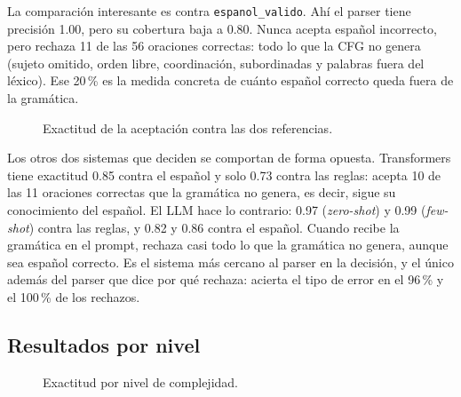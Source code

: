 La comparación interesante es contra \texttt{espanol\_valido}. Ahí el parser tiene precisión
1.00, pero su cobertura baja a 0.80. Nunca acepta español incorrecto, pero rechaza 11 de las 56
oraciones correctas: todo lo que la CFG no genera (sujeto omitido, orden libre, coordinación,
subordinadas y palabras fuera del léxico). Ese 20\,\% es la medida concreta de cuánto español
correcto queda fuera de la gramática.

\begin{figure}[h]
  \centering
  \caption{Exactitud de la aceptación contra las dos referencias.}
  \label{fig:reglas_vs_espanol}
\end{figure}

Los otros dos sistemas que deciden se comportan de forma opuesta. Transformers tiene
exactitud 0.85 contra el español y solo 0.73 contra las reglas: acepta 10 de las 11 oraciones
correctas que la gramática no genera, es decir, sigue su conocimiento del español. El LLM hace
lo contrario: 0.97 (\emph{zero-shot}) y 0.99 (\emph{few-shot}) contra las reglas, y 0.82 y 0.86
contra el español. Cuando recibe la gramática en el prompt, rechaza casi todo lo que la gramática
no genera, aunque sea español correcto. Es el sistema más cercano al parser en la decisión, y el
único además del parser que dice por qué rechaza: acierta el tipo de error en el 96\,\% y el
100\,\% de los rechazos.

\begin{table}[h]
  \centering
  \small
  \caption{Tipo de error esperado frente a la respuesta del sistema, en las 28 oraciones fuera
    de la gramática.}
  \label{tab:tipo_error}
\end{table}

\subsection{Resultados por nivel}

\begin{table}[h]
  \centering
  \small
  \par\medskip
  \caption{Exactitud de la aceptación (arriba) y del etiquetado (abajo) por nivel.}
  \label{tab:por_nivel}
\end{table}

\begin{figure}[h]
  \centering
  \caption{Exactitud por nivel de complejidad.}
  \label{fig:por_nivel}
\end{figure}

